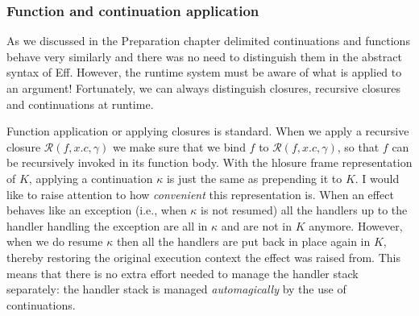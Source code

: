 \documentclass[class=article, crop=false]{standalone}
\begin{document}
\subsubsection{Function and continuation application}

As we discussed in the Preparation chapter delimited continuations and functions
behave very similarly and there was no need to distinguish them in the abstract
syntax of Eff. However, the runtime system must be aware of what is applied to
an argument! Fortunately, we can always distinguish closures, recursive closures
and continuations at runtime.

Function application or applying closures is standard. When we apply a recursive
closure $\mathcal{R}(f, x.c, \gamma)$ we make sure that we bind $f$ to
$\mathcal{R}(f, x.c, \gamma)$, so that $f$ can be recursively invoked in its
function body. With the hlosure frame representation of $K$, applying a
continuation $\kappa$ is just the same as prepending it to $K$. I would like to
raise attention to how \emph{convenient} this representation is. When an effect
behaves like an exception (i.e., when $\kappa$ is not resumed) all the handlers
up to the handler handling the exception are all in $\kappa$ and are not in $K$
anymore. However, when we do resume $\kappa$ then all the handlers are put back
in place again in $K$, thereby restoring the original execution context the
effect was raised from. This means that there is no extra effort needed to
manage the handler stack separately: the handler stack is managed
\emph{automagically} by the use of continuations.
\end{document}
